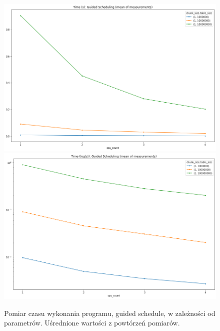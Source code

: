 \documentclass{article}
\begin{document}
        \begin{figure}[h!]
            \centering
            \includegraphics[width=17cm]{report2/images/Type/ex3_guided_mean.png}
            \includegraphics[width=17cm]{report2/images/Type/ex3_guided_mean_log.png}
            \caption{Pomiar czasu wykonania programu, guided schedule, w zależności od parametrów. Uśrednione wartości z powtórzeń pomiarów. }
        \end{figure}
        \newpage
\end{document}
